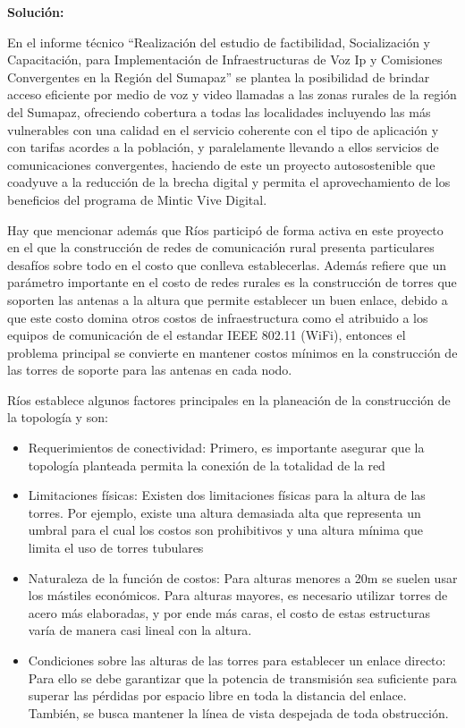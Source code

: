 \documentclass[]{article}
\begin{document}
\textbf{Solución:}

En el informe técnico ``Realización del estudio de factibilidad,
Socialización y Capacitación, para Implementación de Infraestructuras de
Voz Ip y Comisiones Convergentes en la Región del Sumapaz'' se plantea
la posibilidad de brindar acceso eficiente por medio de voz y video
llamadas a las zonas rurales de la región del Sumapaz, ofreciendo
cobertura a todas las localidades incluyendo las más vulnerables con una
calidad en el servicio coherente con el tipo de aplicación y con tarifas
acordes a la población, y paralelamente llevando a ellos servicios de
comunicaciones convergentes, haciendo de este un proyecto autosostenible
que coadyuve a la reducción de la brecha digital y permita el
aprovechamiento de los beneficios del programa de Mintic Vive Digital.

Hay que mencionar además que Ríos participó de forma activa en este
proyecto en el que la construcción de redes de comunicación rural
presenta particulares desafíos sobre todo en el costo que conlleva
establecerlas. Además refiere que un parámetro importante en el costo de
redes rurales es la construcción de torres que soporten las antenas a la
altura que permite establecer un buen enlace, debido a que este costo
domina otros costos de infraestructura como el atribuido a los equipos
de comunicación de el estandar IEEE 802.11 (WiFi), entonces el problema
principal se convierte en mantener costos mínimos en la construcción de
las torres de soporte para las antenas en cada nodo.

Ríos establece algunos factores principales en la planeación de la
construcción de la topología y son:

\begin{itemize}
\item
  Requerimientos de conectividad: Primero, es importante asegurar que la
  topología planteada permita la conexión de la totalidad de la red
\item
  Limitaciones físicas: Existen dos limitaciones físicas para la altura
  de las torres. Por ejemplo, existe una altura demasiada alta que
  representa un umbral para el cual los costos son prohibitivos y una
  altura mínima que limita el uso de torres tubulares
\item
  Naturaleza de la función de costos: Para alturas menores a 20m se
  suelen usar los mástiles económicos. Para alturas mayores, es
  necesario utilizar torres de acero más elaboradas, y por ende más
  caras, el costo de estas estructuras varía de manera casi lineal con
  la altura.
\item
  Condiciones sobre las alturas de las torres para establecer un enlace
  directo: Para ello se debe garantizar que la potencia de transmisión
  sea suficiente para superar las pérdidas por espacio libre en toda la
  distancia del enlace. También, se busca mantener la línea de vista
  despejada de toda obstrucción.
\end{itemize}
\end{document}
